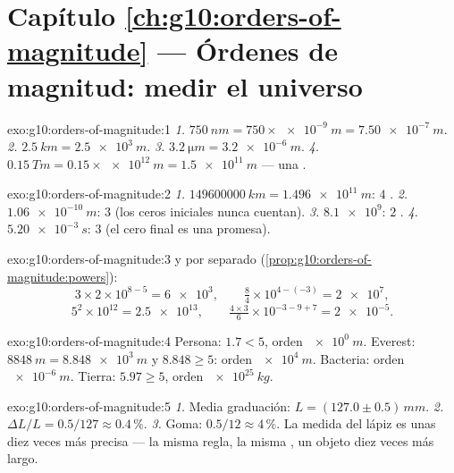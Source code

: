 \section*{Capítulo \ref{ch:g10:orders-of-magnitude} --- Órdenes de magnitud: medir el universo}

\begin{solution}{exo:g10:orders-of-magnitude:1}
\emph{1.} $\qty{750}{nm} = 750 \times \qty{e-9}{m} = \qty{7.50e-7}{m}$.
\emph{2.} $\qty{2.5}{km} = \qty{2.5e3}{m}$.
\emph{3.} $\qty{3.2}{\micro m} = \qty{3.2e-6}{m}$.
\emph{4.} $\qty{0.15}{Tm} = 0.15 \times \qty{e12}{m} = \qty{1.5e11}{m}$
--- una .
\end{solution}

\begin{solution}{exo:g10:orders-of-magnitude:2}
\emph{1.} $\qty{149600000}{km} = \qty{1.496e11}{m}$: $4$ .
\emph{2.} $\qty{1.06e-10}{m}$: $3$  (los ceros
iniciales nunca cuentan).
\emph{3.} $\num{8.1e9}$: $2$ .
\emph{4.} $\qty{5.20e-3}{s}$: $3$  (el cero final
es una promesa).
\end{solution}

\begin{solution}{exo:g10:orders-of-magnitude:3}
 y  por separado
(\cref{prop:g10:orders-of-magnitude:powers}):
\[
3 \times 2 \times 10^{8-5} = \num{6e3}, \qquad
\tfrac{8}{4} \times 10^{4-(-3)} = \num{2e7},
\]
\[
5^{2} \times 10^{12} = \num{2.5e13}, \qquad
\tfrac{4 \times 3}{6} \times 10^{-3-9+7} = \num{2e-5} .
\]
\end{solution}

\begin{solution}{exo:g10:orders-of-magnitude:4}
Persona: $1.7 < 5$, orden $\qty{e0}{m}$. Everest:
$\qty{8848}{m} = \qty{8.848e3}{m}$ y $8.848 \geq 5$: orden
$\qty{e4}{m}$. Bacteria: orden $\qty{e-6}{m}$. Tierra: $5.97 \geq 5$,
orden $\qty{e25}{kg}$.
\end{solution}

\begin{solution}{exo:g10:orders-of-magnitude:5}
\emph{1.} Media graduación: $L = (127.0 \pm 0.5)\,\unit{mm}$.
\emph{2.} $\Delta L / L = 0.5/127 \approx 0.4\,\%$.
\emph{3.} Goma: $0.5/12 \approx 4\,\%$. La medida del lápiz es unas diez
veces más precisa --- la misma regla, la misma ,
un objeto diez veces más largo.
\end{solution}

